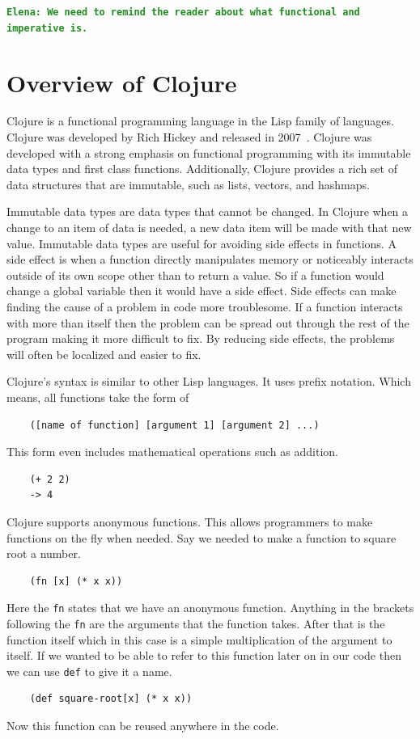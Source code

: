 \documentclass[12pt]{article}
\newcommand{\comment}[1]{{\bf \tt  {#1}}}
\newcommand{\emcomment}[1]{\textcolor{ForestGreen}{\comment{Elena: {#1}}}}
\newcommand{\todo}[1]{\textcolor{blue}{\comment{To Do: {#1}}}}
\newcommand{\mmcomment}[1]{\textcolor{magenta}{\comment{Max: {#1}}}}
\begin{document}
\emcomment{We need to remind the reader about what functional and imperative is.}

\section{Overview of Clojure}\label{sec:clojure}
Clojure is a functional programming language in the Lisp family of languages. Clojure was developed by Rich Hickey and released in 2007~\cite{Hickey:2008}. Clojure was developed with a strong emphasis on functional programming with its immutable data types and first class functions. Additionally, Clojure provides a rich set of data structures that are immutable, such as lists, vectors, and hashmaps.

Immutable data types are data types that cannot be changed. In Clojure when a change to an item of data is needed, a new data item will be made with that new value. Immutable data types are useful for avoiding side effects in functions. A side effect is when a function directly manipulates memory or noticeably interacts outside of its own scope other than to return a value. So if a function would change a global variable then it would have a side effect. Side effects can make finding the cause of a problem in code more troublesome. If a function interacts with more than itself then the problem can be spread out through the rest of the program making it more difficult to fix. By reducing side effects, the problems will often be localized and easier to fix. 

Clojure's syntax is similar to other Lisp languages. It uses prefix notation. Which means, all functions take the form of
\begin{verbatim}
	([name of function] [argument 1] [argument 2] ...)
\end{verbatim}
This form even includes mathematical operations such as addition.
\begin{verbatim}
	(+ 2 2)
	-> 4
\end{verbatim}
Clojure supports anonymous functions. This allows programmers to make functions on the fly when needed. Say we needed to make a function to square root a number.
\begin{verbatim}
	(fn [x] (* x x))
\end{verbatim}
Here the \texttt{fn} states that we have an anonymous function. Anything in the brackets following the \texttt{fn} are the arguments that the function takes. After that is the function itself which in this case is a simple multiplication of the argument to itself. If we wanted to be able to refer to this function later on in our code then we can use \texttt{def} to give it a name.
\begin{verbatim}
	(def square-root[x] (* x x))
\end{verbatim}
Now this function can be reused anywhere in the code.
\end{document}
